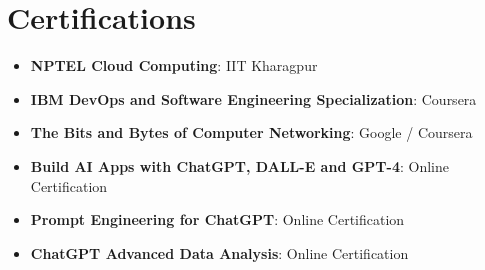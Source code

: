 \documentclass[a4paper,20pt]{article}
\newcommand{\resumeItem}[2]{
  \item\small{
    \textbf{#1}{: #2 \vspace{-2pt}}
  }
}
\newcommand{\resumeSubItem}[2]{\resumeItem{#1}{#2}\vspace{-3pt}}
\newcommand{\resumeSubHeadingListStart}{\begin{itemize}[leftmargin=*]}
\newcommand{\resumeSubHeadingListEnd}{\end{itemize}}
\begin{document}

\section{Certifications}

\resumeSubHeadingListStart

\resumeSubItem{NPTEL Cloud Computing}{IIT Kharagpur}

\resumeSubItem{IBM DevOps and Software Engineering Specialization}{Coursera}

\resumeSubItem{The Bits and Bytes of Computer Networking}{Google / Coursera}

\resumeSubItem{Build AI Apps with ChatGPT, DALL-E and GPT-4}{Online Certification}

\resumeSubItem{Prompt Engineering for ChatGPT}{Online Certification}

\resumeSubItem{ChatGPT Advanced Data Analysis}{Online Certification}

\resumeSubHeadingListEnd
\end{document}

